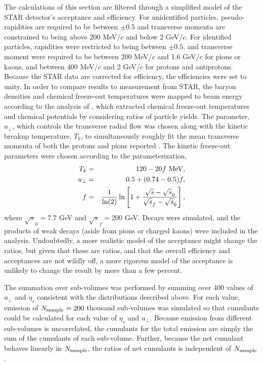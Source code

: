 The calculations of this section are filtered through a simplified model of the STAR detector's acceptance and efficiency. For unidentified particles, pseudo-rapidities are required to be between $\pm 0.5$ and transverse momenta are constrained to being above 200 MeV/$c$ and below 2 GeV/$c$. For identified particles, rapidities were restricted to being between $\pm 0.5$, and transverse moment were required to be between 200 MeV/$c$ and 1.6 GeV/$c$ for pions or kaons, and between 400 MeV/$c$ and 2 GeV/$c$ for protons and antiprotons. Because the STAR data are corrected for efficiency, the efficiencies were set to unity. In order to compare results to measurement from STAR, the baryon densities and chemical freeze-out temperatures were mapped to beam energy according to the analysis of \cite{Kumar:2012np}, which extracted chemical freeze-out temperatures and chemical potentials by considering ratios of particle yields. The parameter, $u_\perp$, which controls the transverse radial flow was chosen along with the kinetic breakup temperature, $T_k$, to simultaneously roughly fit the mean transverse momenta of both the protons and pions reported \cite{Abelev:2009bw}. The kinetic freeze-out parameters were chosen according to the parameterization,
\begin{eqnarray}
T_k&=&120-20f~{\rm MeV},\\
u_\perp&=&0.5+(0.74-0.5)f,\\
f&=&\frac{1}{\ln(2)}
\ln\left[ 1+ \frac{\sqrt{s}-\sqrt{s}_0}{\sqrt{s}_f-\sqrt{s}_0}\right],
\end{eqnarray}
where $\sqrt{s}_0=7.7$ GeV and $\sqrt{s}_f=200$ GeV. Decays were simulated, and the products of weak decays (aside from pions or charged kaons) were included in the analysis. Undoubtedly, a more realistic model of the acceptance might change the ratios, but given that these are ratios, and that the overall efficiency and acceptances are not wildly off, a more rigorous model of the acceptance is unlikely to change the result by more than a few percent.

The summation over sub-volumes was performed by summing over 400 values of $u_\perp$ and $\eta_s$ consistent with the distributions described above. For each value, emission of $N_{\rm sample}=200$ thousand sub-volumes was simulated so that cumulants could be calculated for each value of $\eta_s$ and $u_\perp$. Because emission from different sub-volumes is uncorrelated, the cumulants for the total emission are simply the sum of the cumulants of each sub-volume. Further, because the net cumulant behaves linearly in $N_{\rm sample}$, the ratios of net cumulants is independent of $N_{\rm sample}$.

